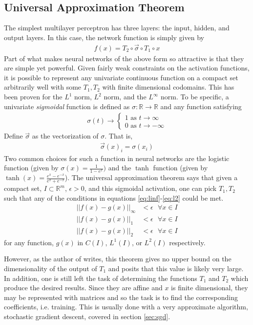 \subsection{Universal Approximation Theorem}
The simplest multilayer perceptron has three layers: the input, hidden, and output layers.  In this case, the network function is simply given by
\begin{align}
f(x) = T_2 \circ \vec{\sigma} \circ T_1 \circ x
\end{align}
Part of what makes neural networks of the above form so attractive is that they are simple yet powerful.  Given fairly weak constraints on the activation functions, it is possible to represent any univariate continuous function on a compact set arbitrarily well with some $T_1,T_2$ with finite dimensional codomains. \cite{gc89} This has been proven for the $L^1$ norm, $L^2$ norm, and the $L^\infty$ norm.  To be specific, a univariate \textit{sigmoidal} function is defined as $\sigma: \mathbb{R}\rightarrow \mathbb{R}$ and any function satisfying
\begin{align}
\sigma(t) \rightarrow
\begin{cases}
1 \text{ as } t\rightarrow \infty\\
0 \text{ as } t\rightarrow -\infty
\end{cases}
\end{align}
Define $\vec{\sigma}$ as the vectorization of $\sigma$.  That is, 
\begin{align}
\vec{\sigma}(x)_i = \sigma(x_i)
\end{align}
Two common choices for such a function in neural networks are the logistic function (given by $\sigma(x) = \frac{1}{1-e^x})$ and the $\tanh$ function (given by $\tanh(x) = \frac{e^x - e^{-x}}{e^x + e^{-x}}$).  The universal approximation theorem says that given a compact set, $I\subset \mathbb{R}^m$, $\epsilon > 0$, and this sigmoidal activation, one can pick $T_1,T_2$ such that any of the conditions in equations \ref{eq:linf}-\ref{eq:l2} could be met.
\begin{align}
\label{eq:linf}||f(x) - g(x)||_\infty &< \epsilon \text{ } \forall x\in I \\
\label{eq:l1}||f(x) - g(x)||_1 &< \epsilon \text{ } \forall x\in I\\
\label{eq:l2}||f(x) - g(x)||_2 &< \epsilon \text{ } \forall x\in I
\end{align}
for any function, $g(x)$ in $C(I)$, $L^1(I)$, or $L^2(I)$ respectively.

However, as the author of \cite{gc89} writes, this theorem gives no upper bound on the dimensionality of the output of $T_1$ and posits that this value is likely very large.  In addition, one is still left the task of determining the functions $T_1$ and $T_2$ which produce the desired results.  Since they are affine and $x$ is finite dimensional, they may be represented with matrices and so the task is to find the corresponding coefficients, i.e. training.  This is usually done with a very approximate algorithm, stochastic gradient descent, covered in section \ref{sec:sgd}.  

